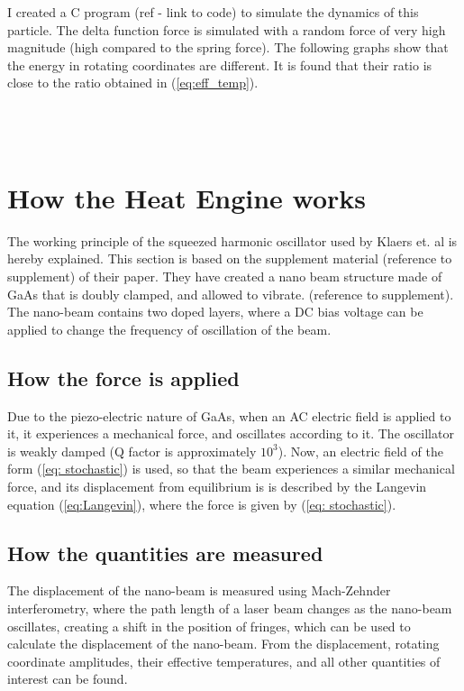 \documentclass[12pt, twoside]{article}
\begin{document}
I created a C program (ref - link to code) to simulate the dynamics of this particle. The delta function force is simulated with a random force of very high magnitude (high compared to the spring force).
The following graphs show that the energy in rotating coordinates are different. It is found that their ratio is close to the ratio obtained in (\ref{eq:eff_temp}).\\\\\\\\

\section{How the Heat Engine works}
The working principle of the squeezed harmonic oscillator used by Klaers et. al is hereby explained. This section is based on the supplement material (reference to supplement) of their paper. They have created a nano beam structure made of GaAs that is doubly clamped, and allowed to vibrate. (reference to supplement). The nano-beam contains two doped layers, where a DC bias voltage can be applied to change the frequency of oscillation of the beam. 
\subsection{How the force is applied}
Due to the piezo-electric nature of GaAs, when an AC electric field is applied to it, it experiences a mechanical force, and oscillates according to it. The oscillator is weakly damped (Q factor is approximately $10^3$). Now, an electric field of the form (\ref{eq: stochastic}) is used, so that the beam experiences a similar mechanical force, and its displacement from equilibrium is is described by the Langevin equation (\ref{eq:Langevin}), where the force is given by (\ref{eq: stochastic}).
\subsection{How the quantities are measured}
The displacement of the nano-beam is measured using Mach-Zehnder interferometry, where the path length of a laser beam changes as the nano-beam oscillates, creating a shift in the position of fringes, which can be used to calculate the displacement of the nano-beam. From the displacement, rotating coordinate amplitudes, their effective temperatures, and all other quantities of interest can be found.
\end{document}

